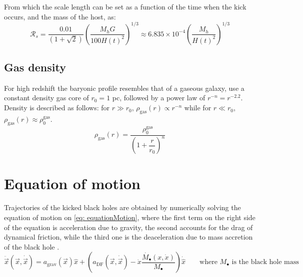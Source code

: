 			From which the scale length can be set as a function of the time when the kick occurs, and the mass of the host, as:
			\begin{equation}
				\mathcal{R}_s = \dfrac{0.01}{\left(1 + \sqrt{2}\right)}\left({\dfrac{M_hG}{100 H(t)^2}}\right)^{1/3} \approx 6.835\times 10^{-4}\left({\dfrac{M_h}{H(t)^2}}\right)^{1/3}
			\end{equation}
		\subsection{Gas density}
			For high redshift the baryonic profile resembles that of a gaseous galaxy, \citeauthor{choksi2017recoiling} use a constant density gas core of $r_0 = 1$ pc, followed by a power law of $r^{-n} = r^{-2.2}$. Density is described as follows: for $r \gg r_0$, $\rho_\text{gas}(r)\propto r^{-n}$ while for $r \ll r_0$, $\rho_\text{gas}(r) \approx \rho_0^\text{gas}$.
			\begin{equation}\label{eq: rdensity}
				\rho_\text{gas}(r) = \dfrac{\rho_0^\text{gas}}{\left(1 + \dfrac{r}{r_0}\right)^n}
			\end{equation}
	
	\section{Equation of motion}
		Trajectories of the kicked black holes are obtained by numerically solving the equation of motion on \autoref{eq: equationMotion}, where the first term on the right side of the equation is acceleration due to gravity, the second accounts for the drag of dynamical friction, while the third one is the deaceleration due to mass accretion of the black hole \cite{tanaka2009assembly, choksi2017recoiling}.
		\begin{equation}\label{eq: equationMotion}
			\ddot{\vec{x}}(\vec{x}, \dot{\vec{x}}) = a_\text{grav}(\vec{x})\hat{x} + \left(a_\text{DF}(\vec{x}, \dot{\vec{x}})-\dot{x}\dfrac{\dot{M_\bullet}(x, \dot{x})}{M_\bullet}\right)\dot{\hat{x}} \qquad \text{where $M_\bullet$ is the black hole mass}
		\end{equation}
		
